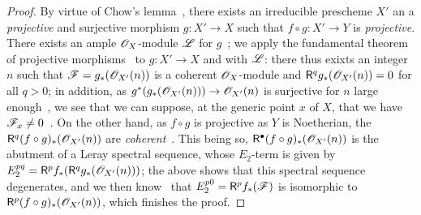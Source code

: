 \begin{proof}
By virtue of Chow's lemma~, there exists an irreducible prescheme $X'$ an a \emph{projective} and surjective morphism $g:X'\to X$ such that $f\circ g:X'\to Y$ is \emph{projective}.
There exists an ample $\mathscr{O}_X$-module $\mathscr{L}$ for $g$~; we apply the fundamental theorem of projective morphisms~ to $g:X'\to X$ and with $\mathscr{L}$: there thus exixts an integer $n$ such that $\mathscr{F}=g_*(\mathscr{O}_{X'}(n))$ is a coherent $\mathscr{O}_X$-module and $\mathsf{R}^q g_*(\mathscr{O}_{X'}(n))=0$ for all $q>0$; in addition, as $g^*(g_*(\OO_{X'}(n)))\to\OO_{X'}(n)$ is surjective for $n$ large enough~, we see that we can suppose, at the generic point $x$ of $X$, that we have $\mathscr{F}_x\neq 0$~.
On the other hand, as $f\circ g$ is projective as $Y$ is Noetherian, the $\mathsf{R}^q(f\circ g)_*(\mathscr{O}_{X'}(n))$ are \emph{coherent}~.
This being so, $\mathsf{R}^\bullet(f\circ g)_*(\mathscr{O}_{X'}(n))$ is the abutment of a Leray spectral sequence, whose $E_2$-term is given by $E_2^{pq}=\mathsf{R}^p f_*(\mathsf{R}^q g_*(\mathscr{O}_{X'}(n)))$; the above shows that this spectral sequence degenerates, and we then know~ that $E_2^{p0}=\mathsf{R}^p f_*(\mathscr{F})$ is isomorphic to $\mathsf{R}^p(f\circ g)_*(\mathscr{O}_{X'}(n))$, which finishes the proof.
\end{proof}



